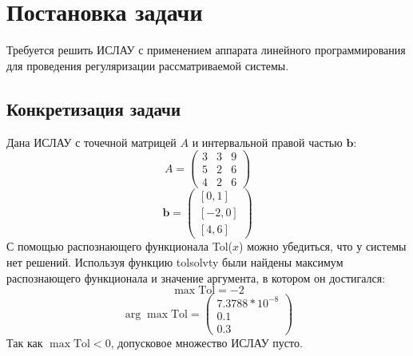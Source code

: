 
\usepackage{amsmath}

\lstset{language=Java} 




\renewcommand\contentsname{\centerline{Содержание}}
\tableofcontents
\newpage

\listoffigures
\newpage


\section{Постановка задачи}

Требуется решить ИСЛАУ с применением аппарата линейного программирования для проведения регуляризации рассматриваемой системы.

\subsection{Конкретизация задачи}
Дана ИСЛАУ с точечной матрицей $A$ и интервальной правой частью $\textbf{b}$: \\
\begin{equation}
	A =
	\begin{pmatrix}
		3 & 3 & 9 \\
		5 & 2 & 6 \\
		4 & 2 & 6
	\end{pmatrix}
\end{equation}
\begin{equation}
	\textbf{b} =
	\begin{pmatrix}
		[0, 1] \\
		[-2, 0] \\
		[4, 6]
	\end{pmatrix}
\end{equation}
С помощью распознающего функционала Tol($x$) можно убедиться, что у системы нет решений. Используя функцию tolsolvty были найдены максимум распознающего функционала и значение аргумента, в котором он достигался: \\
\begin{equation}
	\max \text{Tol} = -2
\end{equation}
\begin{equation}
	\arg \max \text{Tol}=
	\begin{pmatrix}
		7.3788 * 10^{-8} \\
		0.1 \\
		0.3
	\end{pmatrix}
\end{equation}
Так как $\max \text{Tol} < 0$, допусковое множество ИСЛАУ пусто.



